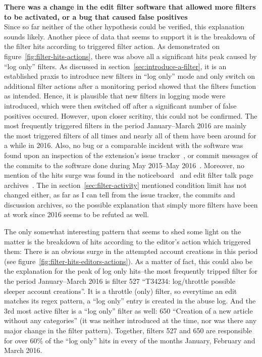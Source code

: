 \textbf{There was a change in the edit filter software that allowed more filters to be activated, or a bug that caused false positives}\\
Since so far neither of the other hypothesis could be verified, this explanation sounds likely.
Another piece of data that seems to support it is the breakdown of the filter hits according to triggered filter action.
As demonstrated on figure~\ref{fig:filter-hits-actions}, there was above all a significant hits peak caused by ``log only'' filters.
As discussed in section~\ref{sec:introduce-a-filter}, it is an established praxis to introduce new filters in ``log only'' mode and only switch on additional filter actions after a monitoring period showed that the filters function as intended.
Hence, it is plausible that new filters in logging mode were introduced, which were then switched off after a significant number of false positives occured.
However, upon closer scritiny, this could not be confirmed.
The most frequently triggered filters in the period January–March 2016 are mainly the most triggered filters of all times and nearly all of them have been around for a while in 2016.
Also, no bug or a comparable incident with the software was found upon an inspection of the extension's issue tracker~\cite{phab-abusefilter-2015}, or commit messages of the commits to the software done during May 2015–May 2016~\cite{gerrit-abusefilter-source}.
Moreover, no mention of the hits surge was found in the noticeboard~\cite{Wikipedia:EditFilterNoticeboard} and edit filter talk page archives~\cite{Wikipedia:EditFilterTalkArchive2016}.
The in section~\ref{sec:filter-activity} mentioned condition limit has not changed either, as far as I can tell from the issue tracker, the commits and discussion archives, so the possible explanation that simply more filters have been at work since 2016 seems to be refuted as well.

The only somewhat interesting pattern that seems to shed some light on the matter is the breakdown of hits according to the editor's action which triggered them:
There is an obvious surge in the attempted account creations in this period (see figure~\ref{fig:filter-hits-editors-actions}).
As a matter of fact, this could also be the explanation for the peak of log only hits–the most frequently tripped filter for the period January–March 2016 is filter 527 ``T34234: log/throttle possible sleeper account creations''.
It is a throttle (only) filter, so everytime an edit matches its regex pattern, a ``log only'' entry is created in the abuse log.
And the 3rd most active filter is a ``log only'' filter as well: 650 ``Creation of a new article without any categories'' (it was neither introduced at the time, nor was there any major change in the filter pattern).
Together, filters 527 and 650 are responsible for over 60\% of the ``log only'' hits in every of the months January, February and March 2016.

